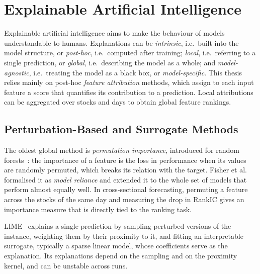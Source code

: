 \section{Explainable Artificial Intelligence}
\label{sec:rw_xai}

Explainable artificial intelligence aims to make the behaviour of models understandable to humans. Explanations can be \emph{intrinsic}, i.e.\ built into the model structure, or \emph{post-hoc}, i.e.\ computed after training; \emph{local}, i.e.\ referring to a single prediction, or \emph{global}, i.e.\ describing the model as a whole; and \emph{model-agnostic}, i.e.\ treating the model as a black box, or \emph{model-specific}. This thesis relies mainly on post-hoc \emph{feature attribution} methods, which assign to each input feature a score that quantifies its contribution to a prediction. Local attributions can be aggregated over stocks and days to obtain global feature rankings.

\subsection{Perturbation-Based and Surrogate Methods}

The oldest global method is \emph{permutation importance}, introduced for random forests~\cite{breiman2001random}: the importance of a feature is the loss in performance when its values are randomly permuted, which breaks its relation with the target. Fisher et al.~\cite{fisher2019all} formalised it as \emph{model reliance} and extended it to the whole set of models that perform almost equally well. In cross-sectional forecasting, permuting a feature across the stocks of the same day and measuring the drop in RankIC gives an importance measure that is directly tied to the ranking task.

LIME~\cite{ribeiro2016lime} explains a single prediction by sampling perturbed versions of the instance, weighting them by their proximity to it, and fitting an interpretable surrogate, typically a sparse linear model, whose coefficients serve as the explanation. Its explanations depend on the sampling and on the proximity kernel, and can be unstable across runs.

